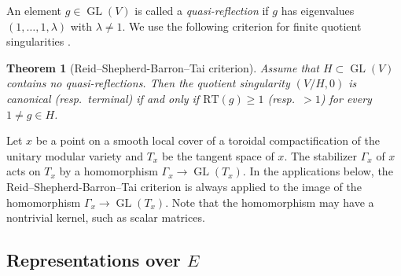 \documentclass[11pt]{amsart}
\theoremstyle{plain}
\newtheorem{thm}{Theorem}[section]
\theoremstyle{definition}
\numberwithin{equation}{section}
\def\GL{\mathop{\mathrm{GL}}\nolimits}
\begin{document}
An element $g\in \GL(V)$ is called a \emph{quasi-reflection}
if $g$ has eigenvalues
$(1,\dots,1,\lambda)$ with $\lambda\ne 1$.
We use the following criterion for finite quotient singularities \cites{reid1987young,tai1982kodaira}.

\begin{thm}[Reid--Shepherd-Barron--Tai criterion]\label{thm:Reid--Shepherd-Barron--Tai}
  Assume that $H\subset \GL(V)$ contains no quasi-reflections. Then the quotient
  singularity $(V/H,0)$ is canonical (resp.\ terminal)  if and only if $\mathrm{RT}(g)\ge 1$ (resp.\ $>1$) for every $1\ne g\in H$.
\end{thm}


Let $x$ be a point on a smooth local cover of a toroidal compactification of the unitary modular variety and $T_x$ be the tangent space of $x$.
The stabilizer $\Gamma_x$ of $x$ acts on $T_x$ by a homomorphism $\Gamma_x \rightarrow \GL(T_x)$.
In the applications below, the Reid--Shepherd-Barron--Tai criterion is always applied to the image of the homomorphism $\Gamma_x \rightarrow \GL(T_x)$.
Note that the homomorphism may have a nontrivial kernel, such as scalar matrices.


\subsection{Representations over \texorpdfstring{$E$}{}}\label{subsec:cyclic-reps}
\end{document}
